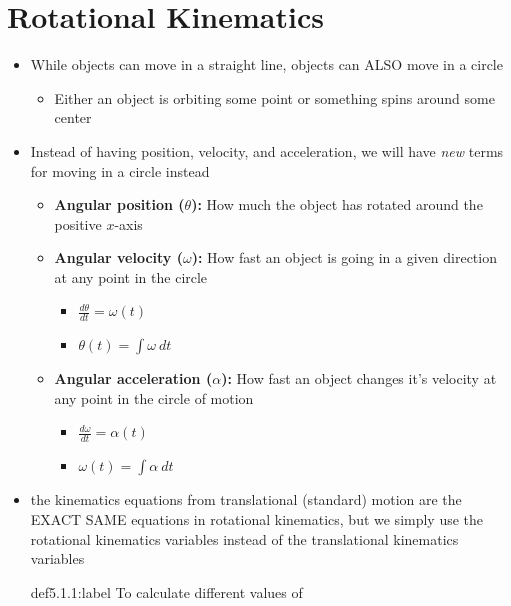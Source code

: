 \section{Rotational Kinematics}

\begin{itemize}
    \item While objects can move in a straight line, objects can ALSO move in a circle
    \begin{itemize}
        \item Either an object is orbiting some point or something spins around some center
    \end{itemize}
    
    \item Instead of having position, velocity, and acceleration, we will have \textit{new} terms for moving in a circle instead
    \begin{itemize}
        \item \textbf{Angular position ($\theta$):} How much the object has rotated around the positive $x$-axis
        \item \textbf{Angular velocity ($\omega$):} How fast an object is going in a given direction at any point in the circle
        \begin{itemize}
            \item $\frac{d\theta}{dt} = \omega(t)$
            \item $\theta(t) = \int \omega \: dt$
        \end{itemize}
        \item \textbf{Angular acceleration ($\alpha$):} How fast an object changes it's velocity at any point in the circle of motion
        \begin{itemize}
            \item $\frac{d\omega}{dt} = \alpha(t)$
            \item $\omega(t) = \int \alpha \: dt$
        \end{itemize}
    \end{itemize}

    \item the kinematics equations from translational (standard) motion are the EXACT SAME equations in rotational kinematics, but we simply use the rotational kinematics variables instead of the translational kinematics variables
    
    \newpage
    \begin{definition}{def5.1.1:label}
        To calculate different values of 


\end{definition}
\end{itemize}
